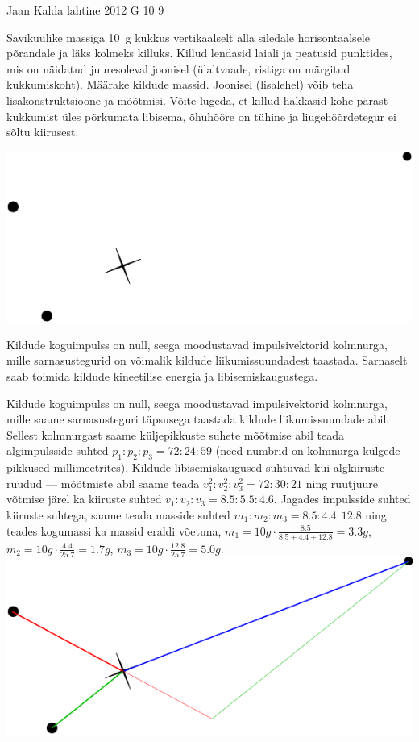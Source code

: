 {Jaan Kalda} %
{lahtine} %
{2012} %
{G 10} %
{9} %
{
\ifStatement
Savikuulike massiga \SI{10}{g} kukkus vertikaalselt alla siledale horisontaalsele
põrandale ja läks kolmeks killuks.
Killud lendasid laiali ja peatusid punktides, mis on näidatud juuresoleval
joonisel
(ülaltvaade, ristiga on märgitud kukkumiskoht). Määrake kildude massid.
Joonisel (lisalehel)
võib teha lisakonstruktsioone ja mõõtmisi.
Võite lugeda, et killud hakkasid kohe pärast kukkumist üles põrkumata libisema,
õhuhõõre on tühine ja liugehõõrdetegur ei sõltu kiirusest.
\begin{center}
\includegraphics[width=0.8\linewidth]{2012-lahg-10-killud}
\end{center}
\fi


\ifHint
Kildude koguimpulss on null, seega moodustavad impulsivektorid kolmnurga, mille sarnasustegurid on võimalik kildude liikumissuundadest taastada. Sarnaselt saab toimida kildude kineetilise energia ja libisemiskaugustega.
\fi


\ifSolution
Kildude koguimpulss on null, seega moodustavad impulsivektorid kolmnurga, mille saame sarnasusteguri täpsusega taastada kildude liikumissuundade abil.
Sellest kolmnurgast saame küljepikkuste suhete mõõtmise abil  teada algimpulsside suhted $p_1 : p_2: p_3 = \num{72} : \num{24} : \num{59}$ (need numbrid on 
kolmnurga külgede pikkused millimeetrites). 
Kildude libisemiskaugused suhtuvad kui algkiiruste ruudud --- mõõtmiste abil saame teada $v_1^2:v_2^2:v_3^2 = \num{72}:\num{30}:\num{21}$ ning ruutjuure võtmise järel ka 
kiiruste suhted $v_1 : v_2: v_3 = \num{8,5}:\num{5,5}:\num{4,6}$. Jagades impulsside suhted kiiruste suhtega, saame teada masside suhted $m_1:m_2:m_3=\num{8,5}:\num{4,4}:\num{12,8}$ 
ning teades kogumassi ka massid eraldi võetuna, $m_1=\SI {10}g\cdot \frac{\num{8,5}}{\num{8,5}+\num{4,4}+\num{12,8}} = \SI{3,3}g$, $m_2=\SI {10}g\cdot \frac{\num{4,4}}{\num{25,7}}=\SI{1,7}g$, 
$m_3=\SI {10}g\cdot \frac{\num{12,8}}{\num{25,7}}=\SI{5,0}g$.\\
\hspace*{0\columnwidth}\includegraphics[width=\columnwidth]{2012-lahg-10-killud_lah}
\fi


}

